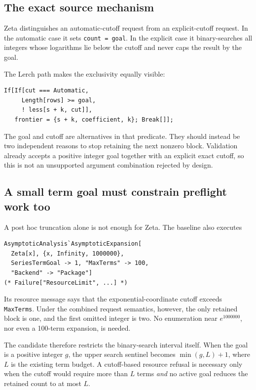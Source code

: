 \documentclass[11pt,letterpaper]{article}
\newcommand{\code}[1]{\nolinkurl{#1}}
\begin{document}
\subsection{The exact source mechanism}
Zeta distinguishes an automatic-cutoff request from an explicit-cutoff request.
In the automatic case it sets \code{count = goal}. In the explicit case it
binary-searches all integers whose logarithms lie below the cutoff and never
caps the result by the goal.

The Lerch path makes the exclusivity equally visible:
\begin{lstlisting}
If[If[cut === Automatic,
     Length[rows] >= goal,
     ! less[s + k, cut]],
   frontier = {s + k, coefficient, k}; Break[]];
\end{lstlisting}
The goal and cutoff are alternatives in that predicate. They should instead be
two independent reasons to stop retaining the next nonzero block. Validation
already accepts a positive integer goal together with an explicit exact cutoff,
so this is not an unsupported argument combination rejected by design.~\cite{dirichlet}

\subsection{A small term goal must constrain preflight work too}
A post hoc truncation alone is not enough for Zeta. The baseline also executes
\begin{lstlisting}
AsymptoticAnalysis`AsymptoticExpansion[
  Zeta[x], {x, Infinity, 1000000},
  SeriesTermGoal -> 1, "MaxTerms" -> 100,
  "Backend" -> "Package"]
(* Failure["ResourceLimit", ...] *)
\end{lstlisting}
Its resource message says that the exponential-coordinate cutoff exceeds
\code{MaxTerms}. Under the combined request semantics, however, the only
retained block is one, and the first omitted integer is two. No enumeration
near $e^{1000000}$, nor even a 100-term expansion, is needed.

The candidate therefore restricts the binary-search interval itself. When the
goal is a positive integer $g$, the upper search sentinel becomes
$\min(g,L)+1$, where $L$ is the existing term budget. A cutoff-based resource
refusal is necessary only when the cutoff would require more than $L$ terms
\emph{and} no active goal reduces the retained count to at most $L$.
\end{document}
